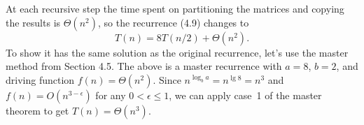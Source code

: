 At each recursive step the time spent on partitioning the matrices and copying the results is $\Theta(n^2)$, so the recurrence (4.9) changes to
\[
    T(n) = 8T(n/2)+\Theta(n^2).
\]
To show it has the same solution as the original recurrence, let's use the master method from Section 4.5.
The above is a master recurrence with $a=8$, $b=2$, and driving function $f(n)=\Theta(n^2)$.
Since $n^{\log_ba}=n^{\lg8}=n^3$ and $f(n)=O(n^{3-\epsilon})$ for any $0<\epsilon\le1$, we can apply case~1 of the master theorem to get $T(n)=\Theta(n^3)$.
